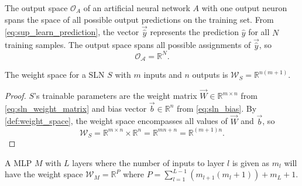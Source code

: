 \begin{definition}
    \label{def:output_space}
    The output space $\mathcal{O}_A$ of an artificial neural network $A$ with one output neuron spans the space of all possible output predictions on the training set.
    From \ref{eq:sup_learn_prediction}, the vector $\vec{\hat{y}}$ represents the prediction $\hat{y}$ for all $N$ training samples.
    The output space spans all possible assignments of $\vec{\hat{y}}$, so
    \begin{equation}
        \mathcal{O_A}=\mathbb{R}^N.
    \end{equation}
\end{definition}

\begin{lemma}
    \label{lmm:weight_space_sln}
    The weight space for a SLN $S$ with $m$ inputs and $n$ outputs is $\mathcal{W}_S = \mathbb{R}^{n(m+1)}$.
\end{lemma}
\begin{proof}
    $S$'s trainable parameters are the weight matrix $\vec{W} \in \mathbb{R}^{m\times n}$ from \ref{eq:sln_weight_matrix} and bias vector $\vec{b} \in \mathbb{R}^n$ from \ref{eq:sln_bias}.
    By \ref{def:weight_space}, the weight space encompasses all values of $\vec{W}$ and $\vec{b}$, so
    \begin{equation*}
        \mathcal{W}_S = \mathbb{R}^{m \times n} \times \mathbb{R}^{n} = \mathbb{R}^{m n + n} = \mathbb{R}^{(m + 1) n}.
    \end{equation*}
\end{proof}

\begin{lemma}
    \label{lmm:weight_space_mlp}
    A MLP $M$ with $L$ layers where the number of inputs to layer $l$ is given as $m_l$ will have the weight space $\mathcal{W}_M = \mathbb{R}^P$ where
    $P = \sum_{l=1}^{L-1}{\left(m_{l+1} (m_l + 1)\right)} + m_L + 1$.
\end{lemma}

